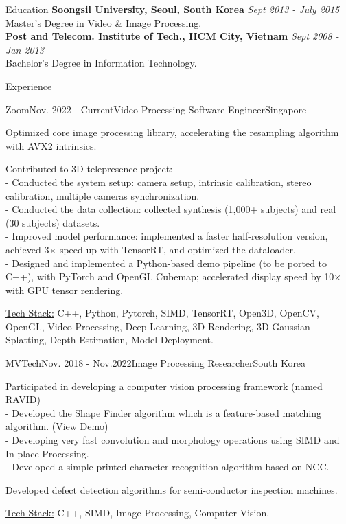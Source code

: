 \documentclass{resume}
\begin{document}
	\begin{rSection}{Education}
		{\bf Soongsil University, Seoul, South Korea} \hfill {\em Sept 2013 - July 2015} \\  {Master's Degree in Video \& Image Processing.} \smallskip \\
		{\bf Post and Telecom. Institute of Tech., HCM City, Vietnam} \hfill {\em Sept 2008 - Jan 2013} \\  {Bachelor's Degree in Information Technology.}
	\end{rSection}

	\begin{rSection}{Experience}
		\begin{rSubsection}{Zoom}{Nov. 2022 - Current}{Video Processing Software  Engineer}{Singapore}
			\item Optimized core image processing library, accelerating the resampling algorithm with AVX2 intrinsics.
			\item Contributed to 3D telepresence project:\\
			- Conducted the system setup: camera setup,  intrinsic calibration, stereo calibration, multiple cameras synchronization.\\
			- Conducted the data collection: collected synthesis (1,000+ subjects) and real (30 subjects) datasets.\\
			- Improved model performance: implemented a faster half-resolution version, achieved 3× speed-up with TensorRT, and optimized the dataloader.\\
			- Designed and implemented a Python-based demo pipeline (to be ported to C++), with PyTorch and OpenGL Cubemap; accelerated display speed by 10× with GPU tensor rendering.
			\item \underline{Tech Stack:} C++, Python, Pytorch, SIMD, TensorRT, Open3D, OpenCV, OpenGL, Video Processing, Deep Learning, 3D Rendering, 3D Gaussian Splatting,  Depth Estimation,  Model Deployment.

		\end{rSubsection}

		\begin{rSubsection}{MVTech}{Nov. 2018 - Nov.2022}{Image Processing Researcher}{South Korea}
			\item Participated in developing a computer vision processing framework (named RAVID) \\
			- Developed the Shape Finder algorithm which is a feature-based matching algorithm. \href{https://blog.naver.com/mvtech_ravid/222119961697}{(View Demo)}\\ 			
- Developing very fast convolution and morphology operations using SIMD and In-place Processing. \\
			- Developed a simple printed character recognition algorithm based on NCC.	
			\item Developed defect detection algorithms for semi-conductor inspection machines.
			\item \underline{Tech Stack:} C++, SIMD, Image Processing, Computer Vision.


\end{rSubsection}
\end{rSection}
\end{document}

